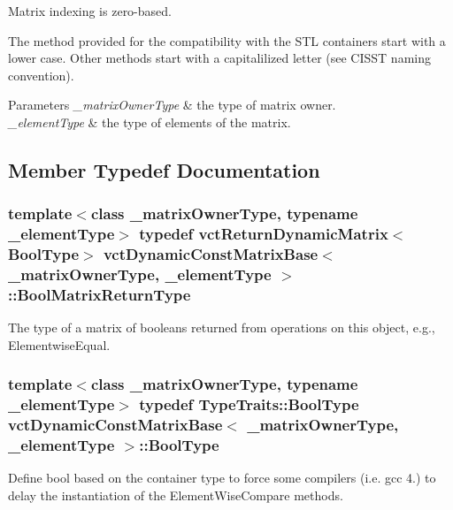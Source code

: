 Matrix indexing is zero-\/based.

The method provided for the compatibility with the S\+T\+L containers start with a lower case. Other methods start with a capitalilized letter (see C\+I\+S\+S\+T naming convention).


\begin{DoxyParams}{Parameters}
{\em \+\_\+matrix\+Owner\+Type} & the type of matrix owner.\\
\hline
{\em \+\_\+element\+Type} & the type of elements of the matrix. \\
\hline
\end{DoxyParams}


\subsection{Member Typedef Documentation}
\hypertarget{classvct_dynamic_const_matrix_base_ac71d88dda7abaaeb2276b83f2e49def7}{}
\subsubsection[{Bool\+Matrix\+Return\+Type}]{\setlength{\rightskip}{0pt plus 5cm}template$<$class \+\_\+matrix\+Owner\+Type, typename \+\_\+element\+Type$>$ typedef {\bf vct\+Return\+Dynamic\+Matrix}$<${\bf Bool\+Type}$>$ {\bf vct\+Dynamic\+Const\+Matrix\+Base}$<$ \+\_\+matrix\+Owner\+Type, \+\_\+element\+Type $>$\+::{\bf Bool\+Matrix\+Return\+Type}}\label{classvct_dynamic_const_matrix_base_ac71d88dda7abaaeb2276b83f2e49def7}
The type of a matrix of booleans returned from operations on this object, e.\+g., Elementwise\+Equal. \hypertarget{classvct_dynamic_const_matrix_base_acc160095f46a6928d71f3eb7d33a1b12}{}
\subsubsection[{Bool\+Type}]{\setlength{\rightskip}{0pt plus 5cm}template$<$class \+\_\+matrix\+Owner\+Type, typename \+\_\+element\+Type$>$ typedef {\bf Type\+Traits\+::\+Bool\+Type} {\bf vct\+Dynamic\+Const\+Matrix\+Base}$<$ \+\_\+matrix\+Owner\+Type, \+\_\+element\+Type $>$\+::{\bf Bool\+Type}}\label{classvct_dynamic_const_matrix_base_acc160095f46a6928d71f3eb7d33a1b12}
Define bool based on the container type to force some compilers (i.\+e. gcc 4.) to delay the instantiation of the Element\+Wise\+Compare methods. \hypertarget{classvct_dynamic_const_matrix_base_a232026578d12a51aa5228dee998b5663}{}
